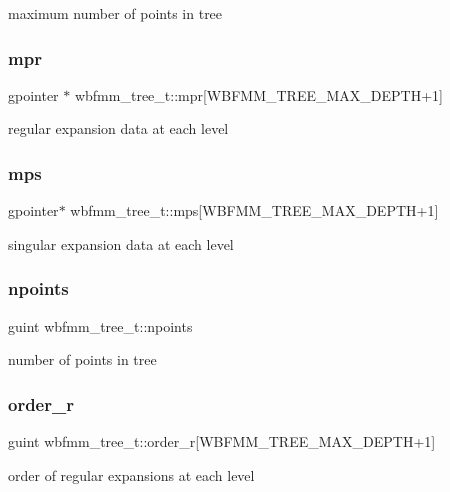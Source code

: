 maximum number of points in tree \mbox{\label{structwbfmm__tree__t_ac47b0aef61e58e198fa06d40e0eff738}} 
\subsubsection{mpr}
{\footnotesize\ttfamily gpointer $\ast$ wbfmm\+\_\+tree\+\_\+t\+::mpr[W\+B\+F\+M\+M\+\_\+\+T\+R\+E\+E\+\_\+\+M\+A\+X\+\_\+\+D\+E\+P\+TH+1]}

regular expansion data at each level \mbox{\label{structwbfmm__tree__t_aaa852afe822a466d84b51c3fb53b5e7b}} 
\subsubsection{mps}
{\footnotesize\ttfamily gpointer$\ast$ wbfmm\+\_\+tree\+\_\+t\+::mps[W\+B\+F\+M\+M\+\_\+\+T\+R\+E\+E\+\_\+\+M\+A\+X\+\_\+\+D\+E\+P\+TH+1]}

singular expansion data at each level \mbox{\label{structwbfmm__tree__t_a05dd3977f0f6f9266dfe5b4de1fd94ea}} 
\subsubsection{npoints}
{\footnotesize\ttfamily guint wbfmm\+\_\+tree\+\_\+t\+::npoints}

number of points in tree \mbox{\label{structwbfmm__tree__t_a3977c9974da5fbeaa66a9b1eea6fd235}} 
\subsubsection{order\+\_\+r}
{\footnotesize\ttfamily guint wbfmm\+\_\+tree\+\_\+t\+::order\+\_\+r[W\+B\+F\+M\+M\+\_\+\+T\+R\+E\+E\+\_\+\+M\+A\+X\+\_\+\+D\+E\+P\+TH+1]}

order of regular expansions at each level \mbox{\label{structwbfmm__tree__t_a4dcb4eecb4b78afa20215a391db8ab0e}} 
